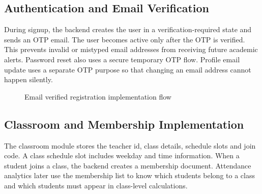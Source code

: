 \subsection{Authentication and Email Verification}

During signup, the backend creates the user in a verification-required state and sends an OTP email. The user becomes active only after the OTP is verified. This prevents invalid or mistyped email addresses from receiving future academic alerts. Password reset also uses a secure temporary OTP flow. Profile email update uses a separate OTP purpose so that changing an email address cannot happen silently.

\begin{figure}[H]
\centering
{}
\caption{Email verified registration implementation flow}
\label{fig:registration-flow}
\end{figure}

\subsection{Classroom and Membership Implementation}

The classroom module stores the teacher id, class details, schedule slots and join code. A class schedule slot includes weekday and time information. When a student joins a class, the backend creates a membership document. Attendance analytics later use the membership list to know which students belong to a class and which students must appear in class-level calculations.

